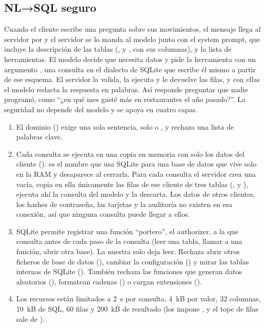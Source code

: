\subsection{NL→SQL seguro}\label{sec:nlsql}

Cuando el cliente escribe una pregunta sobre sus movimientos, el mensaje llega al servidor por  y el
servidor se lo manda al modelo junto con el system prompt, que incluye la descripción de las tablas (,
 y , con sus columnas), y la lista de herramientas. El modelo decide que necesita datos
y pide la herramienta  con un argumento , una consulta  en el dialecto
de SQLite que escribe él mismo a partir de ese esquema. El servidor la valida, la ejecuta y le devuelve las filas, y con
ellas el modelo redacta la respuesta en palabras. Así responde preguntas que nadie programó, como ``¿en qué mes gasté
más en restaurantes el año pasado?''. La seguridad no depende del modelo y se apoya en cuatro capas.

\begin{enumerate}
  \item El dominio () exige una sola sentencia, solo  o
  , y rechaza una lista de palabras clave.
  \item Cada consulta se ejecuta en una copia en memoria con solo los datos del cliente ().
   es el nombre que usa SQLite para una base de datos que vive solo en la RAM y desaparece al cerrarla.
  Para cada consulta el servidor crea una vacía, copia en ella únicamente las filas de ese cliente de tres tablas
  (,  y ), ejecuta ahí la consulta del modelo y la descarta. Los datos de
  otros clientes, los hashes de contraseña, las tarjetas y la auditoría no existen en esa conexión, así que ninguna
  consulta puede llegar a ellos.
  \item SQLite permite registrar una función ``portero'', el authorizer, a la que consulta antes de cada paso de la
  consulta (leer una tabla, llamar a una función, abrir otra base). La nuestra solo deja leer. Rechaza abrir otros
  ficheros de base de datos (), cambiar la configuración () y mirar las tablas internas de
  SQLite (). También rechaza las funciones que generan datos aleatorios (), formatean
  cadenas () o cargan extensiones ().
  \item Los recursos están limitados a 2~s por consulta, 4~kB por valor, 32 columnas, 10~kB de SQL, 60 filas y 200~kB
  de resultado (los impone , y el tope de filas sale de ).
\end{enumerate}

